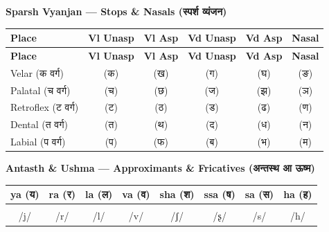 {\bfseries\small Sparsh Vyanjan --- Stops \& Nasals (स्पर्श व्यंजन)}
\begin{longtable}{@{} l c c c c c @{}}
\toprule
\textbf{Place} & \textbf{Vl Unasp} & \textbf{Vl Asp} & \textbf{Vd Unasp} & \textbf{Vd Asp} & \textbf{Nasal} \\
\midrule
\endfirsthead
\toprule
\textbf{Place} & \textbf{Vl Unasp} & \textbf{Vl Asp} & \textbf{Vd Unasp} & \textbf{Vd Asp} & \textbf{Nasal} \\
\midrule
\endhead
\bottomrule
\endfoot

Velar (क वर्ग) & \K{\bka} (क) & \K{\bkha} (ख) & \K{\bga} (ग) & \K{\bgha} (घ) & \K{\bnga} (ङ) \\
Palatal (च वर्ग) & \K{\bca} (च) & \K{\bcha} (छ) & \K{\bja} (ज) & \K{\bjha} (झ) & \K{\bnja} (ञ) \\
Retroflex (ट वर्ग) & \K{\btta} (ट) & \K{\bttha} (ठ) & \K{\bdda} (ड) & \K{\bddha} (ढ) & \K{\bnna} (ण) \\
Dental (त वर्ग) & \K{\bta} (त) & \K{\btha} (थ) & \K{\bda} (द) & \K{\bdha} (ध) & \K{\bna} (न) \\
Labial (प वर्ग) & \K{\bpa} (प) & \K{\bpha} (फ) & \K{\bba} (ब) & \K{\bbha} (भ) & \K{\bma} (म) \\
\bottomrule
\end{longtable}

\vspace{0.4em}

{\bfseries\small Antasth \& Ushma --- Approximants \& Fricatives (अन्तस्थ आ ऊष्म)}
\begin{longtable}{@{} c c c c c c c c @{}}
\toprule
\textbf{ya (य)} & \textbf{ra (र)} & \textbf{la (ल)} & \textbf{va (व)} & \textbf{sha (श)} & \textbf{ssa (ष)} & \textbf{sa (स)} & \textbf{ha (ह)} \\
\midrule
\K{\bya} & \K{\bra} & \K{\bla} & \K{\bva} & \K{\bsha} & \K{\bssa} & \K{\bsa} & \K{\bha} \\
/j/ & /r/ & /l/ & /v/ & /ʃ/ & /ʂ/ & /s/ & /h/ \\
\bottomrule
\end{longtable}

\vspace{0.4em}

